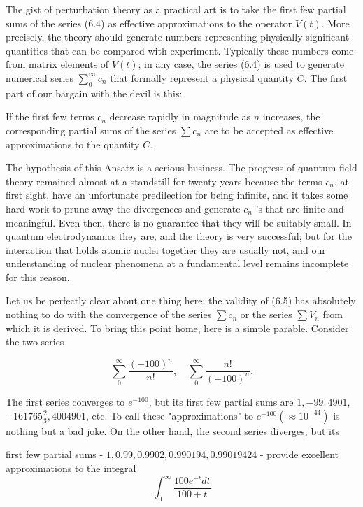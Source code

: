 \documentclass[10pt, letterpaper]{article}
\begin{document}
The gist of perturbation theory as a practical art is to take the first few partial sums of the series (6.4) as effective approximations to the operator $V(t)$. More precisely, the theory should generate numbers representing physically significant quantities that can be compared with experiment. Typically these numbers come from matrix elements of $V(t)$; in any case, the series (6.4) is used to generate numerical series $\sum_{0}^{\infty} c_{n}$ that formally represent a physical quantity $C$. The first part of our bargain with the devil is this:

\begin{displayquote}
If the first few terms $c_{n}$ decrease rapidly in magnitude as $n$ increases, the corresponding partial sums of the series $\sum c_{n}$ are to be accepted as effective approximations to the quantity $C$.
\end{displayquote}

The hypothesis of this Ansatz is a serious business. The progress of quantum field theory remained almost at a standstill for twenty years because the terms $c_{n}$, at first sight, have an unfortunate predilection for being infinite, and it takes some hard work to prune away the divergences and generate $c_{n}$ 's that are finite and meaningful. Even then, there is no guarantee that they will be suitably small. In quantum electrodynamics they are, and the theory is very successful; but for the interaction that holds atomic nuclei together they are usually not, and our understanding of nuclear phenomena at a fundamental level remains incomplete for this reason.

Let us be perfectly clear about one thing here: the validity of (6.5) has absolutely nothing to do with the convergence of the series $\sum c_{n}$ or the series $\sum V_{n}$ from which it is derived. To bring this point home, here is a simple parable. Consider the two series

$$
\sum_{0}^{\infty} \frac{(-100)^{n}}{n!}, \quad \sum_{0}^{\infty} \frac{n!}{(-100)^{n}} .
$$

The first series converges to $e^{-100}$, but its first few partial sums are $1,-99,4901$, $-161765 \frac{2}{3}, 4004901$, etc. To call these "approximations" to $e^{-100}\left(\approx 10^{-44}\right)$ is nothing but a bad joke. On the other hand, the second series diverges, but its

first few partial sums - $1,0.99,0.9902,0.990194,0.99019424$ - provide excellent approximations to the integral
$$
\int_{0}^{\infty} \frac{100 e^{-t} d t}{100+t}
$$
\end{document}
